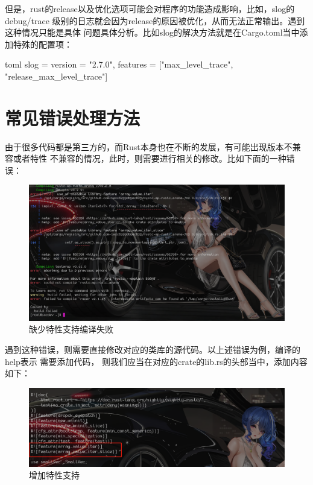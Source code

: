 但是，rust的release以及优化选项可能会对程序的功能造成影响，比如，slog的debug/trace
级别的日志就会因为release的原因被优化，从而无法正常输出。遇到这种情况只能是具体
问题具体分析。比如slog的解决方法就是在Cargo.toml当中添加特殊的配置项：

\begin{code-block}{toml}
slog = {version = "2.7.0", features = ["max_level_trace", "release_max_level_trace"]}
\end{code-block}

\section{常见错误处理方法}
由于很多代码都是第三方的，而Rust本身也在不断的发展，有可能出现版本不兼容或者特性
不兼容的情况，此时，则需要进行相关的修改。比如下面的一种错误：
\begin{figure}[H]
  \centering
  \includegraphics[width=\linewidth]{rust_feature_error.png}
  \caption{缺少特性支持编译失败}
  \label{fig:rust_feature_error}
\end{figure}
遇到这种错误，则需要直接修改对应的类库的源代码。以上述错误为例，编译的help表示
需要添加代码，
则我们应当在对应的crate的lib.rs的头部当中，添加内容如下：
\begin{figure}[H]
  \centering
  \includegraphics[width=\linewidth]{rust_feature_add.png}
  \caption{增加特性支持}
  \label{fig:rust_feature_add}
\end{figure}

